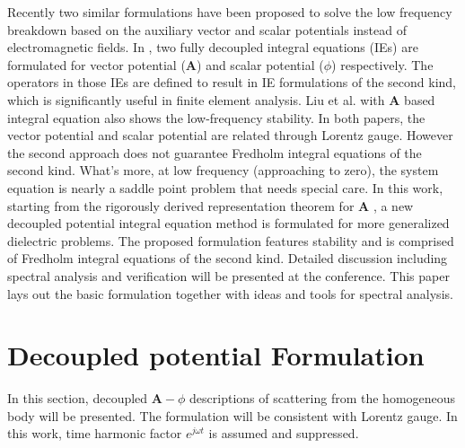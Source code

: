 \documentclass[conference]{IEEEtran}
\begin{document}
Recently two similar formulations \cite{Vico2016,Liu2015} have been proposed to solve the low frequency breakdown based on the auxiliary vector and scalar potentials instead of electromagnetic fields. In \cite{Vico2016}, two fully decoupled integral equations (IEs) are formulated for vector potential ($\mathbf{A}$) and scalar potential ($\phi$) respectively. The operators in those IEs are defined to result in IE formulations of the second kind, which is significantly useful in finite element analysis. 
Liu et al. \cite{Liu2015} with $\mathbf{A}$ based integral equation also shows the low-frequency stability.  In both papers, the vector potential and scalar potential are related through Lorentz gauge. 
However the second approach does not guarantee Fredholm integral equations of the second kind. What's more, at low frequency (approaching to zero), the system equation is nearly a saddle point problem that needs special care. In this work,  starting from the rigorously derived representation theorem for $\mathbf{A}$ \cite{Chew2014}, a new decoupled potential integral equation method is formulated for more generalized dielectric problems.
The proposed formulation features stability and is comprised of Fredholm integral equations of the second kind. Detailed  discussion including spectral analysis and verification will be presented at the conference. This paper lays out the basic formulation together with ideas and tools for spectral analysis.

\section{Decoupled potential Formulation}
In this section, decoupled $\mathbf{A}-\phi$ descriptions of scattering from the homogeneous body will be presented. The formulation will be consistent with Lorentz gauge. In this work, time harmonic factor $e^{j\omega t}$ is assumed and suppressed.
\end{document}
